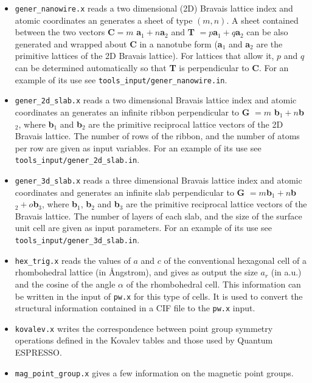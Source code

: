 \documentclass[12pt,a4paper]{article}
\def\qe{{\sc Quantum ESPRESSO}}
\begin{document}
\begin{itemize}
\item \texttt{gener\_nanowire.x} reads a two dimensional (2D)
Bravais lattice index and atomic coordinates an generates a sheet of type
$(m,n)$. A sheet contained between the two vectors 
{\bf C}$ = m$ {\bf a}$_1 + n ${\bf a}$_2$ and {\bf T} $= p ${\bf a}$_1 + q ${\bf a}$_2$
can be also generated and wrapped about {\bf C} in a nanotube form 
({\bf a}$_1$ and {\bf a}$_2$ are the primitive lattices of the 2D Bravais 
lattice). 
For lattices that allow it, $p$ and $q$ can be determined automatically so that 
{\bf T} is perpendicular to {\bf C}.
For an example of its use see \texttt{tools\_input/gener\_nanowire.in}.

\item \texttt{gener\_2d\_slab.x} reads a two dimensional 
Bravais lattice index and atomic coordinates an generates an infinite ribbon
perpendicular to {\bf G} $= m$ {\bf b}$_1 + n ${\bf b}$_2$, where 
{\bf b}$_1$ and {\bf b}$_2$ are the primitive reciprocal lattice vectors 
of the 2D Bravais lattice. The number of rows of the ribbon, and the number of
atoms per row are given as input variables.
For an example of its use see \texttt{tools\_input/gener\_2d\_slab.in}.

\item \texttt{gener\_3d\_slab.x} reads a three dimensional
Bravais lattice index and atomic coordinates and generates an infinite slab
perpendicular to {\bf G} $= m ${\bf b}$_1 + n ${\bf b}$_2 + o ${\bf b}$_3$, 
where {\bf b}$_1$, {\bf b}$_2$ and {\bf b}$_3$ are the primitive reciprocal 
lattice
vectors of the Bravais lattice. The number of layers of each slab, and the
size of the surface unit cell are given as input parameters.
For an example of its use see \texttt{tools\_input/gener\_3d\_slab.in}.

\item \texttt{hex\_trig.x} reads the values of $a$ and $c$
of the conventional hexagonal cell of a rhombohedral lattice (in \AA ngstrom),
and gives as output the size $a_r$ (in a.u.) and the cosine of the angle
$\alpha$ of the rhombohedral cell. This information can
be written in the input of \texttt{pw.x} for this type of cells. It
is used to convert the structural information contained in a CIF file
to the \texttt{pw.x} input.

\item \texttt{kovalev.x} writes the correspondence between point group
symmetry operations defined in the Kovalev tables and those used by \qe.

\item \texttt{mag\_point\_group.x} gives a few information on the magnetic point
groups.


\end{itemize}
\end{document}
